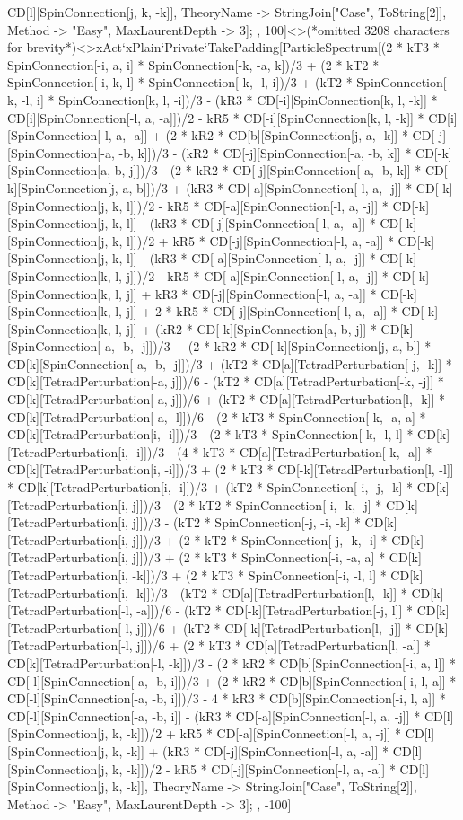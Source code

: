 CD[l][SpinConnection[j, k, -k]], TheoryName -> StringJoin["Case", ToString[2]], Method -> "Easy", MaxLaurentDepth -> 3]; , 100]<>(*omitted 3208 characters for brevity*)<>xAct`xPlain`Private`TakePadding[ParticleSpectrum[(2 * kT3 * SpinConnection[-i, a, i] * SpinConnection[-k, -a, k])/3 + (2 * kT2 * SpinConnection[-i, k, l] * SpinConnection[-k, -l, i])/3 + (kT2 * SpinConnection[-k, -l, i] * SpinConnection[k, l, -i])/3 - (kR3 * CD[-i][SpinConnection[k, l, -k]] * CD[i][SpinConnection[-l, a, -a]])/2 - kR5 * CD[-i][SpinConnection[k, l, -k]] * CD[i][SpinConnection[-l, a, -a]] + (2 * kR2 * CD[b][SpinConnection[j, a, -k]] * CD[-j][SpinConnection[-a, -b, k]])/3 - (kR2 * CD[-j][SpinConnection[-a, -b, k]] * CD[-k][SpinConnection[a, b, j]])/3 - (2 * kR2 * CD[-j][SpinConnection[-a, -b, k]] * CD[-k][SpinConnection[j, a, b]])/3 + (kR3 * CD[-a][SpinConnection[-l, a, -j]] * CD[-k][SpinConnection[j, k, l]])/2 - kR5 * CD[-a][SpinConnection[-l, a, -j]] * CD[-k][SpinConnection[j, k, l]] - (kR3 * CD[-j][SpinConnection[-l, a, -a]] * CD[-k][SpinConnection[j, k, l]])/2 + kR5 * CD[-j][SpinConnection[-l, a, -a]] * CD[-k][SpinConnection[j, k, l]] - (kR3 * CD[-a][SpinConnection[-l, a, -j]] * CD[-k][SpinConnection[k, l, j]])/2 - kR5 * CD[-a][SpinConnection[-l, a, -j]] * CD[-k][SpinConnection[k, l, j]] + kR3 * CD[-j][SpinConnection[-l, a, -a]] * CD[-k][SpinConnection[k, l, j]] + 2 * kR5 * CD[-j][SpinConnection[-l, a, -a]] * CD[-k][SpinConnection[k, l, j]] + (kR2 * CD[-k][SpinConnection[a, b, j]] * CD[k][SpinConnection[-a, -b, -j]])/3 + (2 * kR2 * CD[-k][SpinConnection[j, a, b]] * CD[k][SpinConnection[-a, -b, -j]])/3 + (kT2 * CD[a][TetradPerturbation[-j, -k]] * CD[k][TetradPerturbation[-a, j]])/6 - (kT2 * CD[a][TetradPerturbation[-k, -j]] * CD[k][TetradPerturbation[-a, j]])/6 + (kT2 * CD[a][TetradPerturbation[l, -k]] * CD[k][TetradPerturbation[-a, -l]])/6 - (2 * kT3 * SpinConnection[-k, -a, a] * CD[k][TetradPerturbation[i, -i]])/3 - (2 * kT3 * SpinConnection[-k, -l, l] * CD[k][TetradPerturbation[i, -i]])/3 - (4 * kT3 * CD[a][TetradPerturbation[-k, -a]] * CD[k][TetradPerturbation[i, -i]])/3 + (2 * kT3 * CD[-k][TetradPerturbation[l, -l]] * CD[k][TetradPerturbation[i, -i]])/3 + (kT2 * SpinConnection[-i, -j, -k] * CD[k][TetradPerturbation[i, j]])/3 - (2 * kT2 * SpinConnection[-i, -k, -j] * CD[k][TetradPerturbation[i, j]])/3 - (kT2 * SpinConnection[-j, -i, -k] * CD[k][TetradPerturbation[i, j]])/3 + (2 * kT2 * SpinConnection[-j, -k, -i] * CD[k][TetradPerturbation[i, j]])/3 + (2 * kT3 * SpinConnection[-i, -a, a] * CD[k][TetradPerturbation[i, -k]])/3 + (2 * kT3 * SpinConnection[-i, -l, l] * CD[k][TetradPerturbation[i, -k]])/3 - (kT2 * CD[a][TetradPerturbation[l, -k]] * CD[k][TetradPerturbation[-l, -a]])/6 - (kT2 * CD[-k][TetradPerturbation[-j, l]] * CD[k][TetradPerturbation[-l, j]])/6 + (kT2 * CD[-k][TetradPerturbation[l, -j]] * CD[k][TetradPerturbation[-l, j]])/6 + (2 * kT3 * CD[a][TetradPerturbation[l, -a]] * CD[k][TetradPerturbation[-l, -k]])/3 - (2 * kR2 * CD[b][SpinConnection[-i, a, l]] * CD[-l][SpinConnection[-a, -b, i]])/3 + (2 * kR2 * CD[b][SpinConnection[-i, l, a]] * CD[-l][SpinConnection[-a, -b, i]])/3 - 4 * kR3 * CD[b][SpinConnection[-i, l, a]] * CD[-l][SpinConnection[-a, -b, i]] - (kR3 * CD[-a][SpinConnection[-l, a, -j]] * CD[l][SpinConnection[j, k, -k]])/2 + kR5 * CD[-a][SpinConnection[-l, a, -j]] * CD[l][SpinConnection[j, k, -k]] + (kR3 * CD[-j][SpinConnection[-l, a, -a]] * CD[l][SpinConnection[j, k, -k]])/2 - kR5 * CD[-j][SpinConnection[-l, a, -a]] * CD[l][SpinConnection[j, k, -k]], TheoryName -> StringJoin["Case", ToString[2]], Method -> "Easy", MaxLaurentDepth -> 3]; , -100]